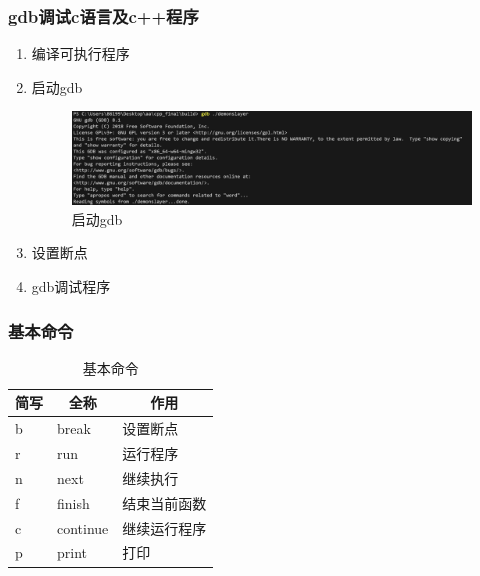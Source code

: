 \documentclass[a4paper,12pt]{article}
\begin{document}
\subsubsection{\color{green}gdb调试c语言及c++程序}
\begin{enumerate}
    \item 编译可执行程序
    \item 启动gdb
    \begin{figure}[h]
        \includegraphics[width=1\textwidth]{gdb.png}
        \caption{启动gdb}
    \end{figure}
    \item 设置断点
    \item gdb调试程序
\end{enumerate}

\newpage
\subsubsection{\color{green}基本命令}
\begin{table}[h]
\centering
\caption{基本命令}
\begin{tabular}{|l|l|l|} 
\hline
\multicolumn{1}{|c|}{简写} & \multicolumn{1}{c|}{全称} & \multicolumn{1}{c|}{作用}  \\ 
\hline
b                        & break                   & 设置断点                     \\ 
\hline
r                        & run                     & 运行程序                     \\ 
\hline
n                        & next                    & 继续执行                     \\ 
\hline
f                        & finish                  & 结束当前函数                   \\ 
\hline
c                        & continue                & 继续运行程序                   \\ 
\hline
p                        & print                   & 打印                       \\
\hline
\end{tabular}
\end{table}
\end{document}
